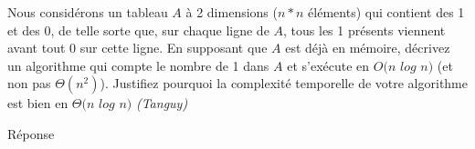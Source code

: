 Nous considérons un tableau $A$ à 2 dimensions ($n * n$ éléments) qui contient des 1 et des 0, de telle sorte que, sur chaque ligne de $A$, tous les 1 présents viennent avant tout 0 sur cette ligne.
En supposant que $A$ est déjà en mémoire, décrivez un algorithme qui compte le nombre de 1 dans $A$ et s'exécute en $O(n$ $log$ $n)$ (et non pas $\Theta(n^2)$).
Justifiez pourquoi la complexité temporelle  de votre algorithme est bien en $\Theta(n$ $log$ $n)$ \textit{(Tanguy)}

Réponse